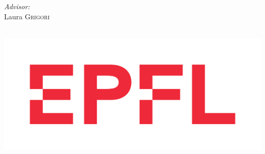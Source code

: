 \begin{titlepage}
\begin{minipage}{0.4\textwidth}
\begin{flushright}
    \emph{Advisor:} \\
    Laura \textsc{Grigori
     }\\
    \end{flushright}
    \end{minipage}\\[10cm]
    
    
    
    \includegraphics[width=0.4\linewidth]{Logo-1 .pdf}\\[1cm] 
     
    
    \vfill %
    
    \end{titlepage}